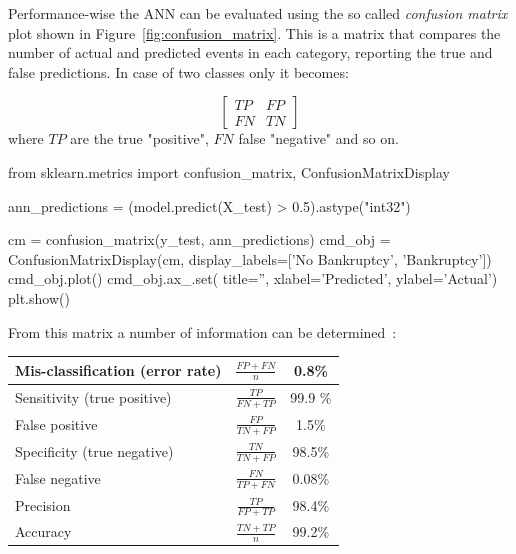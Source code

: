 Performance-wise the ANN can be evaluated using the so called \emph{confusion matrix} plot shown in Figure~\ref{fig:confusion_matrix}. This is a matrix that compares the number of actual and predicted events in each category, reporting the true and false predictions. In case of two classes only it becomes:

\begin{equation*}
\begin{bmatrix}
TP & FP \\
FN & TN  
\end{bmatrix}
\end{equation*}
\noindent
where $TP$ are the true "positive", $FN$ false "negative" and so on.

\begin{ipython}
from sklearn.metrics import confusion_matrix, ConfusionMatrixDisplay

ann_predictions = (model.predict(X_test) > 0.5).astype("int32")

cm = confusion_matrix(y_test, ann_predictions)
cmd_obj = ConfusionMatrixDisplay(cm, display_labels=['No Bankruptcy', 'Bankruptcy'])
cmd_obj.plot()
cmd_obj.ax_.set(
                title='',
                xlabel='Predicted',
                ylabel='Actual')
plt.show()
\end{ipython}

From this matrix a number of information can be determined~\cite{bib:sensitivity}:

\makegapedcells\begin{table}[htbp]
\centering
\begin{tabular}{|l|c|c|}
\hline
Mis-classification (error rate) & $\frac{FP+FN}{n}$ & 0.8\% \\
\hline
Sensitivity (true positive) & $\frac{TP}{FN+TP}$ & 99.9 \% \\
\hline
False positive & $\frac{FP}{TN+FP}$ & 1.5\% \\
\hline
Specificity (true negative) & $\frac{TN}{TN+FP}$ &  98.5\% \\
\hline
False negative & $\frac{FN}{TP+FN}$ & 0.08\% \\
\hline
Precision & $\frac{TP}{FP+TP}$ & 98.4\% \\ 
\hline
Accuracy & $\frac{TN+TP}{n}$ & 99.2\% \\
\hline
\end{tabular}
\end{table}

